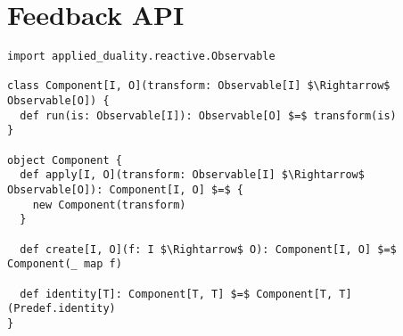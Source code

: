 \chapter{Feedback API}
\label{app:feedback-api}

\begin{lstlisting}[style=ScalaStyle, caption={\comp class}, label={lst:component-class}]
import applied_duality.reactive.Observable

class Component[I, O](transform: Observable[I] $\Rightarrow$ Observable[O]) {
  def run(is: Observable[I]): Observable[O] $=$ transform(is)
}

object Component {
  def apply[I, O](transform: Observable[I] $\Rightarrow$ Observable[O]): Component[I, O] $=$ {
    new Component(transform)
  }

  def create[I, O](f: I $\Rightarrow$ O): Component[I, O] $=$ Component(_ map f)

  def identity[T]: Component[T, T] $=$ Component[T, T](Predef.identity)
}
\end{lstlisting}


